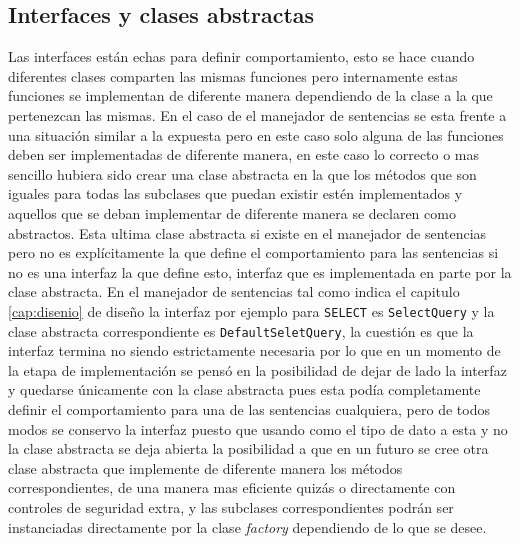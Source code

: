 \subsection{Interfaces y clases abstractas}
%
Las interfaces están echas para definir comportamiento, esto se hace cuando diferentes clases comparten las mismas funciones pero internamente estas funciones se implementan de diferente manera dependiendo de la clase a la que pertenezcan las mismas. En el caso de el manejador de sentencias se esta frente a una situación similar a la expuesta pero en este caso solo alguna de las funciones deben ser implementadas de diferente manera, en este caso lo correcto o mas sencillo hubiera sido crear una clase abstracta en la que los métodos que son iguales para todas las subclases que puedan existir estén implementados y aquellos que se deban implementar de diferente manera se declaren como abstractos. Esta ultima clase abstracta si existe en el manejador de sentencias pero no es explícitamente la que define el comportamiento para las sentencias si no es una interfaz la que define esto, interfaz que es implementada en parte por la clase abstracta. En el manejador de sentencias tal como indica el capitulo \ref{cap:disenio} de diseño la interfaz por ejemplo para \verb=SELECT= es \verb=SelectQuery= y la clase abstracta correspondiente es \verb=DefaultSeletQuery=, la cuestión es que la interfaz termina no siendo estrictamente necesaria por lo que en un momento de la etapa de implementación se pensó en la posibilidad de dejar de lado la interfaz y quedarse únicamente con la clase abstracta pues esta podía completamente definir el comportamiento para una de las sentencias cualquiera, pero de todos modos se conservo la interfaz puesto que usando como el tipo de dato a esta y no la clase abstracta se deja abierta la posibilidad a que en un futuro se cree otra clase abstracta que implemente de diferente manera los métodos correspondientes, de una manera mas eficiente quizás o directamente con controles de seguridad extra, y las subclases correspondientes podrán ser instanciadas directamente por la clase \textit{factory} dependiendo de lo que se desee. 
%

